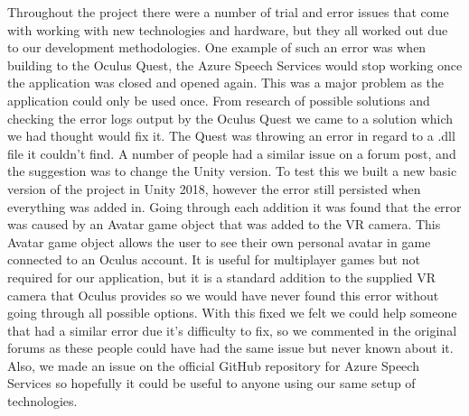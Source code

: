 Throughout the project there were a number of trial and error issues that come with working with new technologies and hardware, but they all worked out due to our development methodologies. One example of such an error was when building to the Oculus Quest, the Azure Speech Services would stop working once the application was closed and opened again. This was a major problem as the application could only be used once. From research of possible solutions and checking the error logs output by the Oculus Quest we came to a solution which we had thought would fix it. The Quest was throwing an error in regard to a .dll file it couldn't find. A number of people had a similar issue on a forum post, and the suggestion was to change the Unity version. To test this we built a new basic version of the project in Unity 2018, however the error still persisted when everything was added in. Going through each addition it was found that the error was caused by an Avatar game object that was added to the VR camera. This Avatar game object allows the user to see their own personal avatar in game connected to an Oculus account. It is useful for multiplayer games but not required for our application, but it is a standard addition to the supplied VR camera that Oculus provides so we would have never found this error without going through all possible options. With this fixed we felt we could help someone that had a similar error due it's difficulty to fix, so we commented in the original forums as these people could have had the same issue but never known about it. Also, we made an issue on the official GitHub repository for Azure Speech Services so hopefully it could be useful to anyone using our same setup of technologies.

